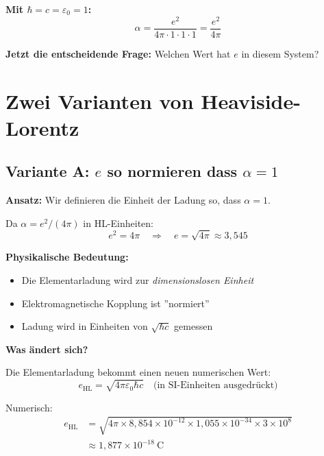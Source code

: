 	\textbf{Mit $\hbar = c = \varepsilon_0 = 1$:}
	\begin{equation}
		\alpha = \frac{e^2}{4\pi \cdot 1 \cdot 1 \cdot 1} = \frac{e^2}{4\pi}
	\end{equation}
	
	\textbf{Jetzt die entscheidende Frage:} Welchen Wert hat $e$ in diesem System?
	
	\section[Zwei Varianten von Heaviside-Lorentz]{Zwei Varianten von Heaviside-Lorentz}
	
	\subsection[Variante A]{Variante A: $e$ so normieren dass $\alpha = 1$}
	
	\textbf{Ansatz:} Wir definieren die Einheit der Ladung so, dass $\alpha = 1$.
	
	Da $\alpha = e^2/(4\pi)$ in HL-Einheiten:
	\begin{equation}
		e^2 = 4\pi \quad \Rightarrow \quad e = \sqrt{4\pi} \approx 3{,}545
	\end{equation}
	
	\textbf{Physikalische Bedeutung:}
	\begin{itemize}
		\item Die Elementarladung wird zur \textit{dimensionslosen Einheit}
		\item Elektromagnetische Kopplung ist ''normiert''
		\item Ladung wird in Einheiten von $\sqrt{\hbar c}$ gemessen
	\end{itemize}
	
	\textbf{Was ändert sich?}
	
	Die Elementarladung bekommt einen neuen numerischen Wert:
	\begin{equation}
		e_{\text{HL}} = \sqrt{4\pi\varepsilon_0\hbar c} \quad \text{(in SI-Einheiten ausgedrückt)}
	\end{equation}
	
	Numerisch:
	\begin{align}
		e_{\text{HL}} &= \sqrt{4\pi \times 8{,}854 \times 10^{-12} \times 1{,}055 \times 10^{-34} \times 3 \times 10^8} \\
		&\approx 1{,}877 \times 10^{-18}\ \text{C}
	\end{align}
	

